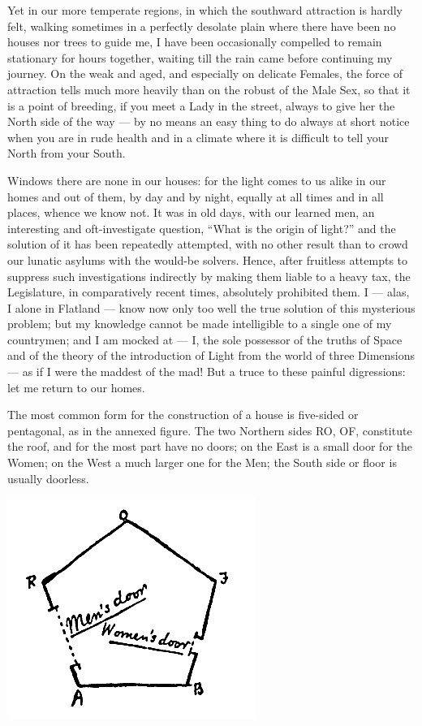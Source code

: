 \documentclass[12pt, a4paper, oneside]{memoir}
\begin{document}
Yet in our more temperate regions, in which the southward attraction is hardly
felt, walking sometimes in a perfectly desolate plain where there have been no
houses nor trees to guide me, I have been occasionally compelled to remain
stationary for hours together, waiting till the rain came before continuing my
journey. On the weak and aged, and especially on delicate Females, the force
of attraction tells much more heavily than on the robust of the Male Sex, so
that it is a point of breeding, if you meet a Lady in the street, always to
give her the North side of the way --- by no means an easy thing to do always at
short notice when you are in rude health and in a climate where it is
difficult to tell your North from your South.

Windows there are none in our houses: for the light comes to us alike in our
homes and out of them, by day and by night, equally at all times and in all
places, whence we know not. It was in old days, with our learned men, an
interesting and oft-investigate question, ``What is the origin of light?'' and
the solution of it has been repeatedly attempted, with no other result than to
crowd our lunatic asylums with the would-be solvers. Hence, after fruitless
attempts to suppress such investigations indirectly by making them liable to a
heavy tax, the Legislature, in comparatively recent times, absolutely
prohibited them. I --- alas, I alone in Flatland --- know now only too well the
true solution of this mysterious problem; but my knowledge cannot be made
intelligible to a single one of my countrymen; and I am mocked at --- I, the
sole possessor of the truths of Space and of the theory of the introduction of
Light from the world of three Dimensions --- as if I were the maddest of the
mad! But a truce to these painful digressions: let me return to our homes.

The most common form for the construction of a house is five-sided or
pentagonal, as in the annexed figure. The two Northern sides RO, OF,
constitute the roof, and for the most part have no doors; on the East is a
small door for the Women; on the West a much larger one for the Men; the South
side or floor is usually doorless.
\begin{center}
\includegraphics[trim=20mm 0mm 0mm 0mm, scale=0.5]{fig2}
\end{center}
\end{document}
